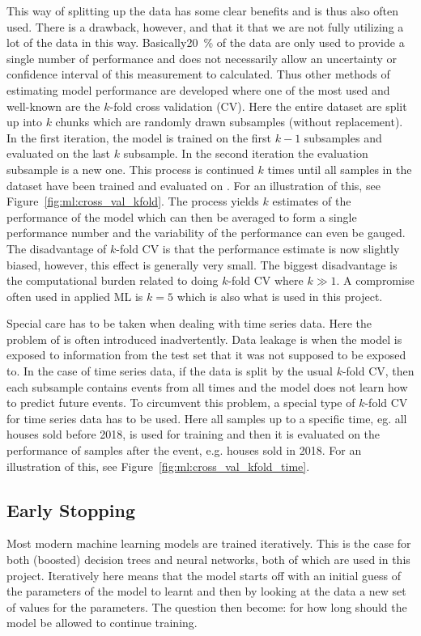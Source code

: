 This way of splitting up the data has some clear benefits and is thus also often used. There is a drawback, however, and that it that we are not fully utilizing a lot of the data in this way. Basically\SI{20}{\percent} of the data are only used to provide a single number of performance and does not necessarily allow an uncertainty or confidence interval of this measurement to calculated. Thus other methods of estimating model performance are developed where one of the most used and well-known are the $k$-fold cross validation (CV). Here the entire dataset are split up into $k$ chunks which are randomly drawn subsamples (without replacement). In the first iteration, the model is trained on the first $k-1$ subsamples and evaluated on the last $k$ subsample. In the second iteration the evaluation subsample is a new one. This process is continued $k$ times until all samples in the dataset have been trained and evaluated on \citep{hastieElementsStatisticalLearning2009}. For an illustration of this, see Figure~\ref{fig:ml:cross_val_kfold}. The process yields $k$ estimates of the performance of the model which can then be averaged to form a single performance number and the variability of the performance can even be gauged. The disadvantage of $k$-fold CV is that the performance estimate is now slightly biased, however, this effect is generally very small. The biggest disadvantage is the computational burden related to doing $k$-fold CV where $k\gg 1$. A compromise often used in applied ML is $k=5$ which is also what is used in this project.  

Special care has to be taken when dealing with time series data. Here the problem of  is often introduced inadvertently. Data leakage is when the model is exposed to information from the test set that it was not supposed to be exposed to. In the case of time series data, if the data is split by the usual $k$-fold CV, then each subsample contains events from all times and the model does not learn how to predict future events. To circumvent this problem, a special type of $k$-fold CV for time series data has to be used. Here all samples up to a specific time, eg. all houses sold before 2018, is used for training and then it is evaluated on the performance of samples after the event, e.g. houses sold in \num{2018}. For an illustration of this, see Figure~\ref{fig:ml:cross_val_kfold_time}.


\subsection{Early Stopping}
\label{subsec:early_stopping}
Most modern machine learning models are trained iteratively. This is the case for both (boosted) decision trees and neural networks, both of which are used in this project. Iteratively here means that the model starts off with an initial guess of the parameters of the model to learnt and then by looking at the data  a new set of values for the parameters. The question then become: for how long should the model be allowed to continue training. 

